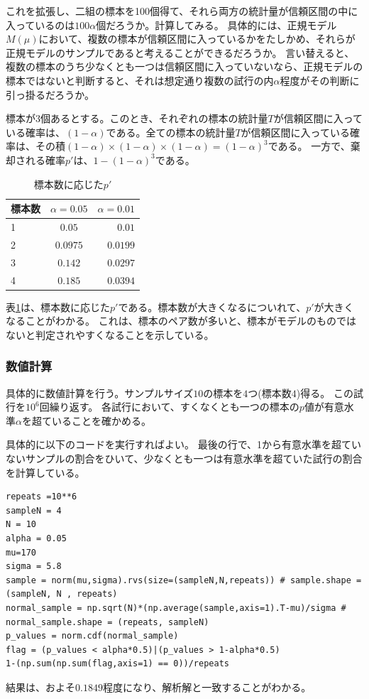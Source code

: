 これを拡張し、二組の標本を100個得て、それら両方の統計量が信頼区間の中に入っているのは$100\alpha$個だろうか。計算してみる。
具体的には、正規モデル$M(\mu)$において、複数の標本が信頼区間に入っているかをたしかめ、それらが正規モデルのサンプルであると考えることができるだろうか。
言い替えると、複数の標本のうち少なくとも一つは信頼区間に入っていないなら、正規モデルの標本ではないと判断すると、それは想定通り複数の試行の内$\alpha$程度がその判断に引っ掛るだろうか。

標本が$3$個あるとする。このとき、それぞれの標本の統計量$T$が信頼区間に入っている確率は、$(1-\alpha)$である。全ての標本の統計量$T$が信頼区間に入っている確率は、その積$(1-\alpha)\times(1-\alpha)\times(1-\alpha)=(1-\alpha)^3$である。
一方で、棄却される確率$p'$は、$1-(1-\alpha)^3$である。

\begin{table}[hbtp]
    \caption{標本数に応じた$p'$}
    \label{table:multiple_test_reject_prob}
    \centering
    \begin{tabular}{lcr}
      \hline
      標本数  & $\alpha=0.05$  &  $\alpha=0.01$ \\
      \hline \hline
       1 & $0.05$  & $0.01$ \\
       2 & $0.0975$ & $0.0199$\\
       3 & $0.142$ & $0.0297$\\
       4 & $0.185$ & $0.0394$\\
    \end{tabular}
  \end{table}
表\ref{table:multiple_test_reject_prob}は、標本数に応じた$p'$である。標本数が大きくなるについれて、$p'$が大きくなることがわかる。
これは、標本のペア数が多いと、標本がモデルのものではないと判定されやすくなることを示している。


\subsubsection{数値計算}
具体的に数値計算を行う。サンプルサイズ$10$の標本を$4$つ(標本数$4$)得る。
この試行を$10^6$回繰り返す。
各試行において、すくなくとも一つの標本の$p$値が有意水準$\alpha$を超ていることを確かめる。

具体的に以下のコードを実行すればよい。
最後の行で、1から有意水準を超ていないサンプルの割合をひいて、少なくとも一つは有意水準を超ていた試行の割合を計算している。
\begin{lstlisting}
repeats =10**6
sampleN = 4
N = 10
alpha = 0.05
mu=170
sigma = 5.8
sample = norm(mu,sigma).rvs(size=(sampleN,N,repeats)) # sample.shape = (sampleN, N , repeats)
normal_sample = np.sqrt(N)*(np.average(sample,axis=1).T-mu)/sigma # normal_sample.shape = (repeats, sampleN)
p_values = norm.cdf(normal_sample)
flag = (p_values < alpha*0.5)|(p_values > 1-alpha*0.5)
1-(np.sum(np.sum(flag,axis=1) == 0))/repeats
\end{lstlisting}
結果は、およそ$0.1849$程度になり、解析解と一致することがわかる。

